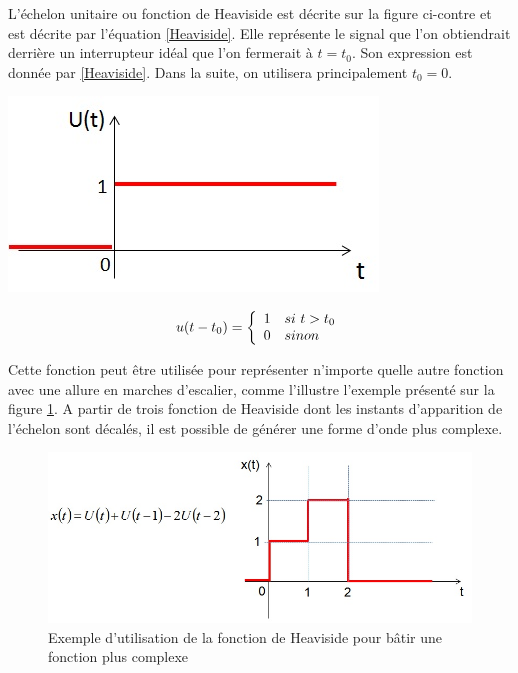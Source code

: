 \documentclass[]{report}
\begin{document}
	\begin{minipage}[l]{0.7\linewidth}
		L'échelon unitaire ou fonction de Heaviside est décrite sur la figure ci-contre et est décrite par l'équation \ref{Heaviside}. Elle représente le signal que l'on obtiendrait derrière un interrupteur
		idéal que l'on fermerait à $t = t_{0}$. Son expression est donnée par \ref{Heaviside}. Dans la suite, on utilisera principalement $t_{0} = 0$.	
	\end{minipage} \hfill
	\begin{minipage}[r]{0.4\linewidth}
		\includegraphics[scale=0.5]{images/Heaviside.jpg} 	
	\end{minipage}
	 
	\begin{equation}\label{Heaviside}
	u(t-t_{0}) = \left \{
	\begin{array}{l l}
	1  & si~t>t_{0} \\
	0   & sinon \\
	\end{array}
	\right .	 	
	\end{equation}
	
	
	Cette fonction peut être utilisée pour représenter n'importe quelle autre fonction avec une allure en marches d'escalier, comme l'illustre l'exemple présenté sur la figure \ref{Fig:Utilisation_Heaviside}. A partir de trois fonction de Heaviside dont les instants d'apparition de l'échelon sont décalés, il est possible de générer une forme d'onde plus complexe.
	\begin{figure}[h!]
		\centering
		\includegraphics[scale=0.5]{images/Utilisation_Heaviside.jpg} 
		\caption{Exemple d'utilisation de la fonction de Heaviside pour bâtir une fonction plus complexe}	
		\label{Fig:Utilisation_Heaviside}
	\end{figure}
	
\end{document}
